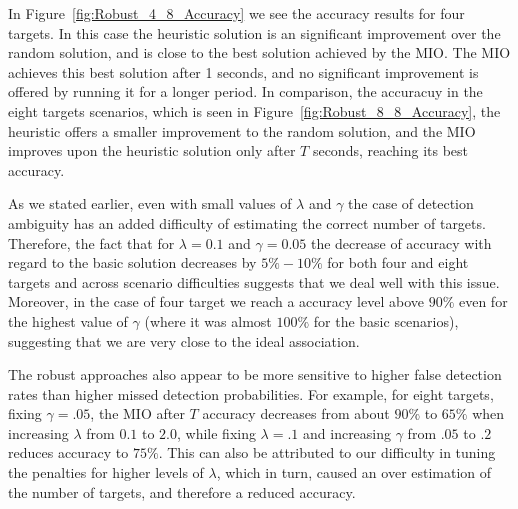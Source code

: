 In Figure~\ref{fig:Robust_4_8_Accuracy} we see the accuracy results for four targets. In this case the heuristic solution is an significant improvement over the random solution, and is close to the best solution achieved by the MIO. The MIO achieves this best solution after 1 seconds, and no significant improvement is offered by running it for a longer period. In comparison, the accuracuy in the eight targets scenarios, which is seen in Figure~\ref{fig:Robust_8_8_Accuracy}, the heuristic offers a smaller improvement to the random solution, and the MIO improves upon the heuristic solution only  after $T$ seconds, reaching its best accuracy. 

As we stated earlier, even with small values of $\lambda$ and $\gamma$ the case of detection ambiguity has an added difficulty of estimating the correct number of targets. Therefore, the fact that for $\lambda=0.1$ and $\gamma=0.05$ the decrease of accuracy with regard to the basic solution decreases by $5\%-10\%$ for both four and eight targets and across scenario difficulties suggests that we deal  well with this issue. Moreover, in the case of four target we reach a accuracy level above $90\%$  even for the highest value of $\gamma$ (where it was almost $100\%$ for the basic scenarios), suggesting that we are very close to the ideal association.%

The robust approaches also appear to be more sensitive to higher false detection rates than higher missed detection probabilities. For example, for eight targets, fixing $\gamma=.05$, the MIO after $T$ accuracy decreases from about $90\%$ to $65\%$ when increasing $\lambda$ from $0.1$ to $2.0$, while fixing $\lambda=.1$ and increasing $\gamma$ from $.05$ to $.2$ reduces accuracy to $75\%$. This can also be attributed to our difficulty in tuning the penalties for higher levels of $\lambda$, which in turn, caused an over estimation of the number of targets, and therefore a reduced accuracy. 

